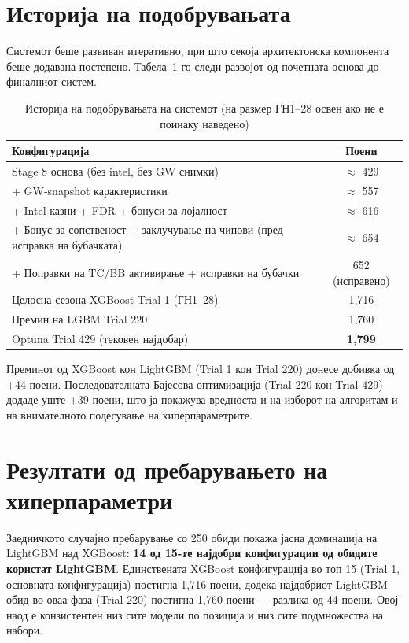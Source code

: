 \section{Историја на подобрувањата}

Системот беше развиван итеративно, при што секоја архитектонска компонента беше додавана постепено. Табела~\ref{tab:improvement_mk} го следи развојот од почетната основа до финалниот систем.

\begin{table}[h]
\centering
\caption{Историја на подобрувањата на системот (на размер ГН1--28 освен ако не е поинаку наведено)}
\label{tab:improvement_mk}
\begin{tabular}{lc}
\toprule
\textbf{Конфигурација} & \textbf{Поени} \\
\midrule
Stage 8 основа (без intel, без GW снимки)        & $\approx$ 429 \\
+ GW-snapshot карактеристики                      & $\approx$ 557 \\
+ Intel казни + FDR + бонуси за лојалност         & $\approx$ 616 \\
+ Бонус за сопственост + заклучување на чипови (пред исправка на бубачката) & $\approx$ 654 \\
+ Поправки на TC/BB активирање + исправки на бубачки & 652 (исправено) \\
Целосна сезона XGBoost Trial 1 (ГН1--28)          & 1{,}716 \\
Премин на LGBM Trial 220                          & 1{,}760 \\
Optuna Trial 429 (тековен најдобар)               & \textbf{1{,}799} \\
\bottomrule
\end{tabular}
\end{table}

Преминот од XGBoost кон LightGBM (Trial 1 кон Trial 220) донесе добивка од +44 поени. Последователната Бајесова оптимизација (Trial 220 кон Trial 429) додаде уште +39 поени, што ја покажува вредноста и на изборот на алгоритам и на внимателното подесување на хиперпараметрите.

\section{Резултати од пребарувањето на хиперпараметри}

Заедничкото случајно пребарување со 250 обиди покажа јасна доминација на LightGBM над XGBoost: \textbf{14 од 15-те најдобри конфигурации од обидите користат LightGBM}. Единствената XGBoost конфигурација во топ 15 (Trial 1, основната конфигурација) постигна 1{,}716 поени, додека најдобриот LightGBM обид во оваа фаза (Trial 220) постигна 1{,}760 поени — разлика од 44 поени. Овој наод е конзистентен низ сите модели по позиција и низ сите подмножества на набори.

